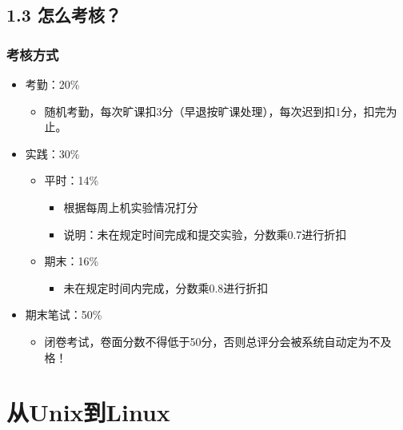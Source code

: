 \documentclass[xcolor=svgnames,presentation]{beamer}
\begin{document}
\subsection{1.3 怎么考核？}
\label{sec-1-3}
\begin{frame}
\frametitle{考核方式}
\label{sec-1-3-1}
\begin{itemize}

\item 考勤：20\%
\label{sec-1-3-1-1}%
\begin{itemize}

\item 随机考勤，每次旷课扣3分（早退按旷课处理），每次迟到扣1分，扣完为止。
\label{sec-1-3-1-1-1}%
\end{itemize} %

\item 实践：30\%
\label{sec-1-3-1-2}%
\begin{itemize}

\item 平时：14\%
\label{sec-1-3-1-2-1}%
\begin{itemize}

\item 根据每周上机实验情况打分
\label{sec-1-3-1-2-1-1}%

\item 说明：未在规定时间完成和提交实验，分数乘0.7进行折扣
\label{sec-1-3-1-2-1-2}%
\end{itemize} %

\item 期末：16\%
\label{sec-1-3-1-2-2}%
\begin{itemize}

\item 未在规定时间内完成，分数乘0.8进行折扣
\label{sec-1-3-1-2-2-1}%
\end{itemize} %
\end{itemize} %

\item 期末笔试：50\%
\label{sec-1-3-1-3}%
\begin{itemize}

\item 闭卷考试，卷面分数不得低于50分，否则总评分会被系统自动定为不及格！
\label{sec-1-3-1-3-1}%
\end{itemize} %
\end{itemize} %
\end{frame}
\section{从Unix到Linux}
\label{sec-2}
\end{document}
